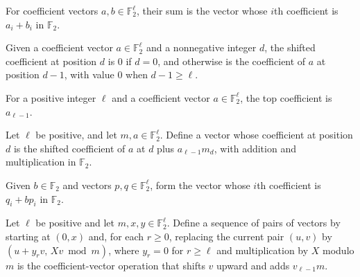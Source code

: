 \begin{definition}
\label{FABL.binaryAdd}
\leanok
{}
For coefficient vectors $a,b\in\mathbb{F}_2^\ell$, their sum is the vector whose $i$th
coefficient is $a_i+b_i$ in $\mathbb{F}_2$.
\end{definition}

\begin{definition}
\label{FABL.binaryShiftUpCoefficient}
\leanok
{}
Given a coefficient vector $a\in\mathbb{F}_2^\ell$ and a nonnegative integer $d$, the
shifted coefficient at position $d$ is $0$ if $d=0$, and otherwise is the coefficient of
$a$ at position $d-1$, with value $0$ when $d-1\ge\ell$.
\end{definition}

\begin{definition}
\label{FABL.binaryTopCoefficient}
\leanok
{}
For a positive integer $\ell$ and a coefficient vector $a\in\mathbb{F}_2^\ell$, the top
coefficient is $a_{\ell-1}$.
\end{definition}

\begin{definition}
\label{FABL.binaryXMulMod}
\leanok
{}
Let $\ell$ be positive, and let $m,a\in\mathbb{F}_2^\ell$. Define a vector whose
coefficient at position $d$ is the shifted coefficient of $a$ at $d$ plus
$a_{\ell-1}m_d$, with addition and multiplication in $\mathbb{F}_2$.
\end{definition}

\begin{definition}
\label{FABL.binaryScaleAdd}
\leanok
{}
Given $b\in\mathbb{F}_2$ and vectors $p,q\in\mathbb{F}_2^\ell$, form the vector whose
$i$th coefficient is $q_i+bp_i$ in $\mathbb{F}_2$.
\end{definition}

\begin{definition}
\label{FABL.binaryMulModState}
\leanok
{}
Let $\ell$ be positive and let $m,x,y\in\mathbb{F}_2^\ell$. Define a sequence of pairs
of vectors by starting at $(0,x)$ and, for each $r\ge0$, replacing the current pair
$(u,v)$ by $(u+y_rv,\,Xv\bmod m)$, where $y_r=0$ for $r\ge\ell$ and multiplication by
$X$ modulo $m$ is the coefficient-vector operation that shifts $v$ upward and adds
$v_{\ell-1}m$.
\end{definition}

